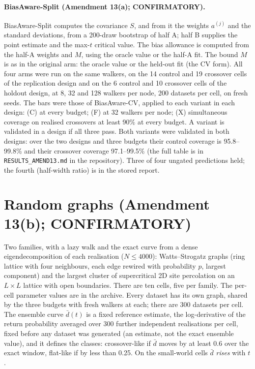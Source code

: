 \documentclass[aps,pre,twocolumn,superscriptaddress,nofootinbib,10pt]{revtex4-2}
\begin{document}
\paragraph*{\textsf{BiasAware-Split} (Amendment 13(a); CONFIRMATORY).}\label{sup:a13}
\textsf{BiasAware-Split} computes the covariance $S$, and from it the weights $a^{(j)}$ and the standard deviations, from a 200-draw bootstrap of half A; half B supplies the point estimate and the max-$t$ critical value. The bias allowance is computed from the half-A weights and $M$, using the oracle value or the half-A fit. The bound $M$ is as in the original arm: the oracle value or the held-out fit (the CV form). All four arms were run on the same walkers, on the 14 control and 19 crossover cells of the replication design and on the 6 control and 10 crossover cells of the holdout design, at 8, 32 and 128 walkers per node, 200 datasets per cell, on fresh seeds. The bars were those of \textsf{BiasAware-CV}, applied to each variant in each design: (C) at every budget; (F) at 32 walkers per node; (X) simultaneous coverage on realised crossovers at least 90\% at every budget. A variant is validated in a design if all three pass. Both variants were validated in both designs: over the two designs and three budgets their control coverage is 95.8--99.8\% and their crossover coverage 97.1--99.5\% (the full table is in \texttt{RESULTS\_AMEND13.md} in the repository). Three of four ungated predictions held; the fourth (half-width ratio) is in the stored report.

\section{Random graphs (Amendment 13(b); CONFIRMATORY)}\label{sup:rand}
Two families, with a lazy walk and the exact curve from a dense eigendecomposition of each realisation ($N\le4000$): Watts--Strogatz graphs (ring lattice with four neighbours, each edge rewired with probability $p$, largest component) and the largest cluster of supercritical 2D site percolation on an $L\times L$ lattice with open boundaries. There are ten cells, five per family. The per-cell parameter values are in the archive. Every dataset has its own graph, shared by the three budgets with fresh walkers at each; there are 300 datasets per cell. The ensemble curve $\bar d(t)$ is a fixed reference estimate, the log-derivative of the return probability averaged over 300 further independent realisations per cell, fixed before any dataset was generated (an estimate, not the exact ensemble value), and it defines the classes: crossover-like if $\bar d$ moves by at least 0.6 over the exact window, flat-like if by less than 0.25. On the small-world cells $\bar d$ \emph{rises} with $t$.
\end{document}
